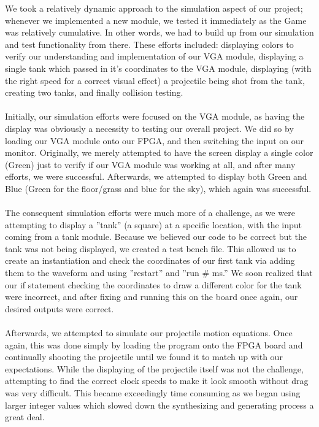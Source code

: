 \documentclass{article}
\begin{document}
We took a relatively dynamic approach to the simulation aspect of our project; whenever we implemented a new module, we tested it immediately as the Game was relatively cumulative.  In other words, we had to build up from our simulation and test functionality from there.  These efforts included: displaying colors to verify our understanding and implementation of our VGA module, displaying a single tank which passed in it's coordinates to the VGA module, displaying (with the right speed for a correct visual effect) a projectile being shot from the tank, creating two tanks, and finally collision testing.  
 \\
 \\
Initially, our simulation efforts were focused on the VGA module, as having the display was obviously a necessity to testing our overall project.  We did so by loading our VGA module onto our FPGA, and then switching the input on our monitor.  Originally, we merely attempted to have the screen display a single color (Green) just to verify if our VGA module was working at all, and after many efforts, we were successful.  Afterwards, we attempted to display both Green and Blue (Green for the floor/grass and blue for the sky), which again was successful.
\\
\\
The consequent simulation efforts were much more of a challenge, as we were attempting to display a ''tank'' (a square) at a specific location, with the input coming from a tank module.  Because we believed our code to be correct but the tank was not being displayed, we created a test bench file.  This allowed us to create an instantiation and check the coordinates of our first tank via adding them to the waveform and using ''restart'' and ''run \# ms.''  We soon realized that our if statement checking the coordinates to draw a different color for the tank were incorrect, and after fixing and running this on the board once again, our desired outputs were correct.
\\
\\
Afterwards, we attempted to simulate our projectile motion equations.  Once again, this was done simply by loading the program onto the FPGA board and continually shooting the projectile until we found it to match up with our expectations.  While the displaying of the projectile itself was not the challenge, attempting to find the correct clock speeds to make it look smooth without drag was very difficult.  This became exceedingly time consuming as we began using larger integer values which slowed down the synthesizing and generating process a great deal. 
\end{document}

